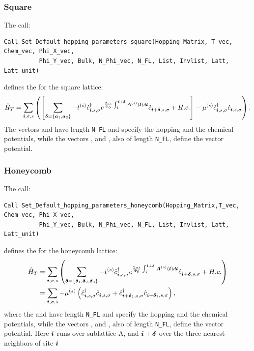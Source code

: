 \subsubsection*{Square}
The call:
\begin{lstlisting}[style=fortran]
 Call Set_Default_hopping_parameters_square(Hopping_Matrix, T_vec, Chem_vec, Phi_X_vec,  
          Phi_Y_vec, Bulk, N_Phi_vec, N_FL, List, Invlist, Latt, Latt_unit)
\end{lstlisting}
defines  the   for the square  lattice: 
\begin{equation}
\hat{H}_T  =   \sum_{\boldsymbol{i}, \sigma, s}  \left( \left[ \sum_{ \boldsymbol{\delta} = \left\{ \boldsymbol{a}_1, \boldsymbol{a}_2\right\} }    - t^{(s)} \hat{c}^{\dagger}_{\boldsymbol{i},s,\sigma}   e^{\frac{2 \pi i}{\Phi_0} \int_{\boldsymbol{i}}^{\boldsymbol{i}+ \boldsymbol{\delta}}  \boldsymbol{A}^{(s)}(\boldsymbol{l})  d \boldsymbol{l}}   \hat{c}^{}_{\boldsymbol{i} + \boldsymbol{\delta},s,\sigma} +  H.c.   \right]    -  \mu^{(s)} \hat{c}^{\dagger}_{\boldsymbol{i},s,\sigma} \hat{c}^{}_{\boldsymbol{i},s,\sigma}  \right).
\end{equation}
The vectors   and  have  length \texttt{N\_FL} and specify the hopping and the chemical potentials, while the  vectors ,   and ,  also of  length  \texttt{N\_FL},    define the vector potential. 


\subsubsection*{Honeycomb}
The call: 
 \begin{lstlisting}[style=fortran]
 Call Set_Default_hopping_parameters_honeycomb(Hopping_Matrix,T_vec, Chem_vec, Phi_X_vec,
          Phi_Y_vec, Bulk, N_Phi_vec, N_FL, List, Invlist, Latt, Latt_unit)
\end{lstlisting}
defines  the   for the  honeycomb lattice: 
\begin{align}
\hat{H}_T  &=  \sum_{\boldsymbol{i}, \sigma, s}  \left(  \sum_{ \boldsymbol{\delta} = \left\{ \boldsymbol{\delta}_1, \boldsymbol{\delta}_2, \boldsymbol{\delta}_3\right\} }    - t^{(s)} \hat{c}^{\dagger}_{\boldsymbol{i},s,\sigma}   e^{\frac{2 \pi i}{\Phi_0} \int_{\boldsymbol{i}}^{\boldsymbol{i}+ \boldsymbol{\delta}}  \boldsymbol{A}^{(s)}(\boldsymbol{l})  d \boldsymbol{l}}   \hat{c}^{}_{\boldsymbol{i} + \boldsymbol{\delta},s,\sigma} +  H.c. \right)   \nonumber \\   
    &=  \sum_{\boldsymbol{i}, \sigma, s}   -  \mu^{(s)} \left( \hat{c}^{\dagger}_{\boldsymbol{i},s,\sigma} \hat{c}^{}_{\boldsymbol{i},s,\sigma}   +  \hat{c}^{\dagger}_{\boldsymbol{i} + \boldsymbol{\delta}_1,s,\sigma} \hat{c}^{}_{\boldsymbol{i} + \boldsymbol{\delta}_1,s,\sigma}   \right),
\end{align}
where the  and  have  length \texttt{N\_FL} and specify the hopping and the chemical potentials, while the  vectors ,   and ,  also of  length  \texttt{N\_FL}, define the vector potential.  Here $\boldsymbol{i}$  runs over  sublattice  A, and $\boldsymbol{i} + \boldsymbol{\delta}$  over the three nearest neighbors of site $\boldsymbol{i}$



